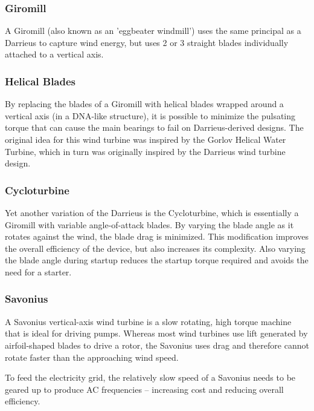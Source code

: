 \documentclass[12pt,a4paper]{article}
\begin{document}
 
 
 
\subsubsection{Giromill}
A Giromill (also known as an 'eggbeater windmill') uses the same principal as a Darrieus to capture wind energy, but uses 2 or 3 straight blades individually attached to a vertical axis.
 
 
\subsubsection{Helical Blades}
By replacing the blades of a Giromill with helical blades wrapped around a vertical axis (in a DNA-like structure), it is possible to minimize the pulsating torque that can cause the main bearings to fail on Darrieus-derived designs.
The original idea for this wind turbine was inspired by the Gorlov Helical Water Turbine, which in turn was originally inspired by the Darrieus wind turbine design.
 
 
\subsubsection{Cycloturbine}
Yet another variation of the Darrieus is the Cycloturbine, which is essentially a Giromill with variable angle-of-attack blades. By varying the blade angle as it rotates against the wind, the blade drag is minimized. This modification improves the overall efficiency of the device, but also increases its complexity. Also varying the blade angle during startup reduces the startup torque required and avoids the need for a starter.
\subsubsection{Savonius}
A Savonius vertical-axis wind turbine is a slow rotating, high torque machine that is ideal for driving pumps. Whereas most wind turbines use lift generated by airfoil-shaped blades to drive a rotor, the Savonius uses drag and therefore cannot rotate faster than the approaching wind speed.
 
To feed the electricity grid, the relatively slow speed of a Savonius needs to be geared up to produce AC frequencies – increasing cost and reducing overall efficiency.

\newpage
\end{document}
